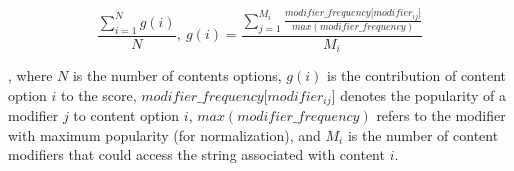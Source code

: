\documentclass[sigconf,review, anonymous]{acmart}
\begin{document}
\[\frac{\sum_{i=1}^{N}g(i)}{N},~g(i)=\frac{\sum_{j=1}^{M_i}\frac{\mathit{modifier\_frequency[modifier_{ij}}]}{\mathit{max(modifier\_frequency)}}}{M_i}\]

\noindent
, where $N$ is the number of contents options, $g(i)$ is the
contribution of content option $i$ to the score,
$\mathit{modifier\_frequency[modifier_{ij}}]$ denotes the popularity
of a modifier $j$ to content option $i$,
$\mathit{max(modifier\_frequency)}$ refers to the modifier with
maximum popularity (for normalization), and $M_i$ is the number of
content modifiers that could access the string associated with content
$i$.


                                                                             
\end{document}
